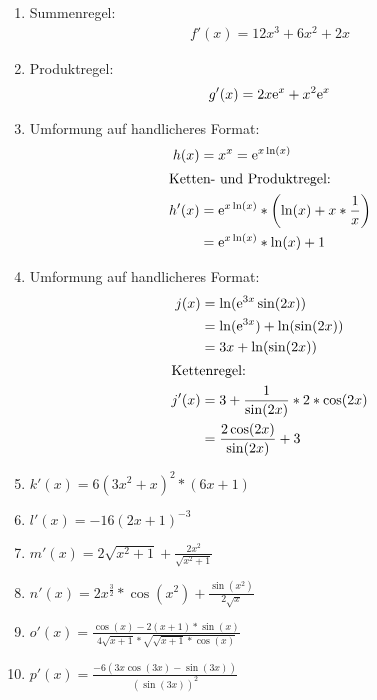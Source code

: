 \begin{lsg}{}
	\begin{multicols}{2}
		\begin{enumerate}
			\item Summenregel: \begin{align*}
			f'(x)=12x^3+6x^2+2x
			\end{align*}
			\item Produktregel: \begin{align*}
			g'(x)=2x\mathrm{e}^x+x^2\mathrm{e}^x
			\end{align*}
			\item Umformung auf handlicheres Format: \begin{align*}
		    h(x)&= x^x= \mathrm{e}^{x\ln(x)}\\
		    \intertext{Ketten- und Produktregel: }
				h'(x)&=\mathrm{e}^{x\ln(x)}* \left(\ln(x)+x*\frac{1}{x}\right) \\
				&= \mathrm{e}^{x\ln(x)}*\ln(x)+1
		  \end{align*}
		  \item Umformung auf handlicheres Format: \begin{align*}
		    j(x)&= \ln(\mathrm{e}^{3x}\sin(2x))\\
				&= \ln(\mathrm{e}^{3x}) + \ln(\sin(2x)) \\
				&= 3x + \ln(\sin(2x))\\
				\intertext{Kettenregel:}
		    j'(x)&=3+\frac{1}{\sin(2x)} * 2*\cos(2x) \\
				&= \frac{2\cos(2x)}{\sin(2x)}+3
		  \end{align*}
			\item $k'(x) = 6(3x^2+x)^2*(6x+1)$
	    \item $l'(x) = -16(2x+1)^{-3}$
	    \item $m'(x) = 2\sqrt{x^2+1}+\frac{2x^2}{\sqrt{x^2+1}}$
	    \item $n'(x) = 2x^{\frac 3 2}*\cos(x^2)+\frac{\sin(x^2)}{2\sqrt x}$
	    \item $o'(x) = \frac{\cos(x)-2(x+1)*\sin(x)}{4\sqrt{x+1}*\sqrt{\sqrt{x+1}*\cos(x)}}$
	    \item $p'(x) = \frac{-6\left(3x\cos(3x)-\sin(3x)\right)}{\left(\sin(3x)\right)^2}$
		\end{enumerate}
	\end{multicols}
\end{lsg}




